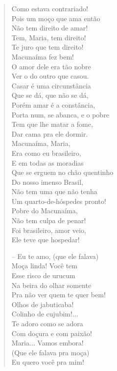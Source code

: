 \begin{verse}
Como estava contrariado!\\
Pois um moço que ama então\\
Não tem direito de amar!\\
Tem, Maria, tem direito!\\
Te juro que tem direito!\\
Macunaíma fez bem!\\
O amor dele era tão nobre\\
Ver o do outro que casou.\\
Casar é uma circunstância\\
Que se dá, que não se dá,\\
Porém amar é a constância,\\
Porta num, se abanca, e o pobre\\
Tem que lhe matar a fome,\\
Dar cama pra ele dormir.\\
Macunaíma, Maria,\\
Era como eu brasileiro,\\
E em todas as moradias\\
Que se erguem no chão quentinho\\
Do nosso imenso Brasil,\\
Não tem uma que não tenha\\
Um quarto-de-hóspedes pronto!\\
Pobre do Macunaíma,\\
Não tem culpa de penar!\\
Foi brasileiro, amor veio,\\
Ele teve que hospedar!

-- Eu te amo, (que ele falava)\\
Moça linda! Você tem\\
Esse risco de urucum\\
Na beira do olhar somente\\
Pra não ver quem te quer bem!\\
Olhos de jabuticaba!\\
Colinho de cujubim!...\\
Te adoro como se adora\\
Com doçura e com paixão!\\
Maria... Vamos embora!\\
(Que ele falava pra moça)\\
Eu quero você pra mim!


\end{verse}
